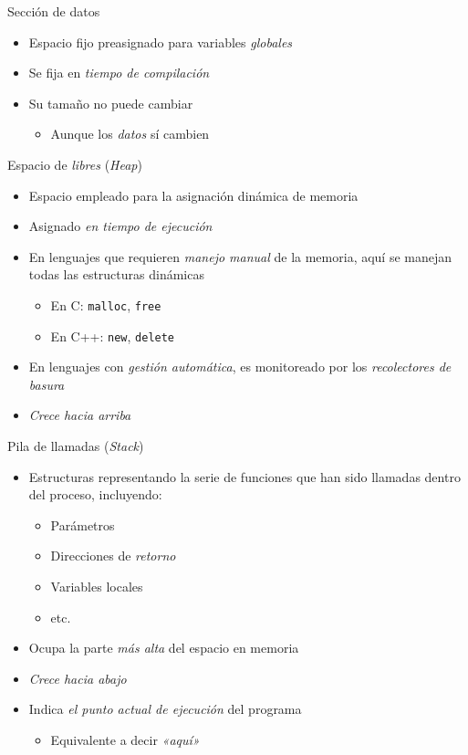 \documentclass[presentation]{beamer}
\begin{document}
\begin{frame}[label={sec:org454ec67}]{Sección de datos}
\begin{itemize}
\item Espacio fijo preasignado para variables \emph{globales}
\item Se fija en \emph{tiempo de compilación}
\item Su tamaño no puede cambiar
\begin{itemize}
\item Aunque los \emph{datos} sí cambien
\end{itemize}
\end{itemize}
\end{frame}

\begin{frame}[label={sec:orga69a963},fragile]{Espacio de \emph{libres} (\emph{Heap})}
 \begin{itemize}
\item Espacio empleado para la asignación dinámica de memoria
\item Asignado \emph{en tiempo de ejecución}
\item En lenguajes que requieren \emph{manejo manual} de la memoria, aquí se
manejan todas las estructuras dinámicas
\begin{itemize}
\item En C: \texttt{malloc}, \texttt{free}
\item En C++: \texttt{new}, \texttt{delete}
\end{itemize}
\item En lenguajes con \emph{gestión automática}, es monitoreado por los
\emph{recolectores de basura}
\item \emph{Crece hacia arriba}
\end{itemize}
\end{frame}

\begin{frame}[label={sec:orge07e435}]{Pila de llamadas (\emph{Stack})}
\begin{itemize}
\item Estructuras representando la serie de funciones que han sido
llamadas dentro del proceso, incluyendo:
\begin{itemize}
\item Parámetros
\item Direcciones de \emph{retorno}
\item Variables locales
\item etc.
\end{itemize}
\item Ocupa la parte \emph{más alta} del espacio en memoria
\item \emph{Crece hacia abajo}
\item Indica \emph{el punto actual de ejecución} del programa
\begin{itemize}
\item Equivalente a decir \emph{«aquí»}
\end{itemize}
\end{itemize}
\end{frame}
\end{document}
